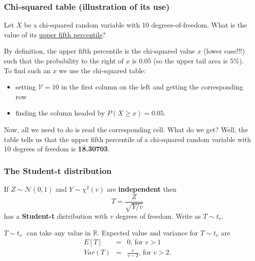 \documentclass[notes=show,smaller,handout]{beamer}\usepackage[]{graphicx}\usepackage[]{color}
\newcommand{\N}{\mathcal{N}}
\begin{document}
\begin{frame}%

\frametitle{Chi-squared table (illustration of its use)}

\begin{example}

Let $X$ be a chi-squared random variable with 10 degrees-of-freedom. What is the value of its \underline{upper fifth percentile}? \vspace{0.6cm}

By definition, the upper fifth percentile is the chi-squared value $x$ (lower case!!!) such that the probability to the right of $x$ is $0.05$ (so the upper tail area is $5\%$).  To find such an $x$ we use the chi-squared table: \vspace{0.1cm}
\begin{itemize}
\item setting $\mathcal{V} = 10$ in the first column on the left and getting the corresponding row \vspace{0.1cm}
\item finding the column headed by $P(X \geq x) = 0.05$. \vspace{0.1cm}
\end{itemize}

Now, all we need to do is read the corresponding cell. What do we get? Well, the table tells us that the upper fifth percentile of a chi-squared random variable with 10 degrees of freedom is \textbf{18.30703}.



\end{example}



\end{frame}%

\begin{frame}%

\frametitle{The Student-t distribution}

\begin{definition}
If $Z\sim \N(0,1)$ and $Y\sim \chi ^{2}(v)$ are \textbf{independent}
then%
\begin{equation*}
T=\frac{Z}{\sqrt{Y/v}}
\end{equation*}%
has a \textbf{Student-t} distribution with $v$ degrees of freedom. Write as $T\sim t_{v}$.
\end{definition}
\vspace{0.5cm}
$T\sim t_{v}\,$\ can take any value in $\mathbb{R}$. Expected value and variance for $T\sim t_{v}$ are
\begin{eqnarray*}
E\left[ T\right] &=&0\text{, for }v>1 \\
Var\left( T\right) &=&\frac{v}{v-2}\text{, for }v>2.
\end{eqnarray*}

\end{frame}%
\end{document}
